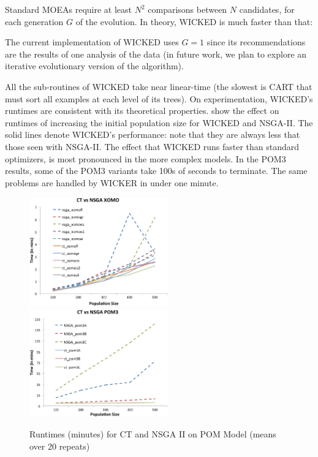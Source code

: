 Standard MOEAs require at least $N^2$ comparisons
between $N$ candidates, for each generation $G$ of the evolution. In theory,
WICKED is much faster than that:
\bi
\item The current implementation of WICKED uses $G=1$
since its recommendations are the results of one analysis of the data
(in future work, we plan to explore an iterative evolutionary version of the 
algorithm).
\item All the sub-routines of WICKED take near linear-time (the
slowest is CART that must sort all examples at each level of its trees).
\ei
On experimentation, WICKED's runtimes are consistent with its
theoretical properties.  show the effect on runtimes
of increasing the initial population size for WICKED and NSGA-II.
The solid lines denote WICKED's performance: note that they are always less
that those seen with NSGA-II. 
The effect that WICKED runs faster than standard optimizers, is most
pronounced in the more complex models. In the POM3 results, some of the POM3 variants
take 100s of seconds to terminate. The same problems are handled by WICKER in
under one minute. 



\begin{figure}
\includegraphics[width=6cm]{naveen/figures/xomotimes.png}
\includegraphics[width=6cm]{naveen/figures/pomtimes.png}
\caption{ Runtimes (minutes) for CT and NSGA II on POM Model
(means over 20 repeats)}\label{fig:pomtimes}
\end{figure}


